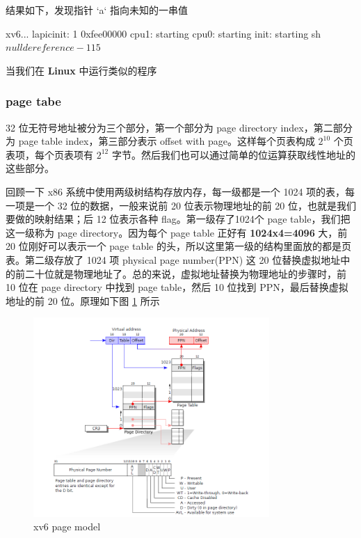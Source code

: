 结果如下，发现指针 `a` 指向未知的一串值

\begin{textcode}
xv6...
lapicinit: 1 0xfee00000
cpu1: starting
cpu0: starting
init: starting sh
$ nulldereference
-115
$ 
\end{textcode}

当我们在 \textbf{Linux} 中运行类似的程序


\subsubsection{page tabe}

32 位无符号地址被分为三个部分，第一个部分为 page directory index，第二部分为 page table index，第三部分表示 offset with page。这样每个页表构成 $2^{10}$ 个页表项，每个页表项有 $2^{12}$ 字节。然后我们也可以通过简单的位运算获取线性地址的这些部分。

回顾一下 x86 系统中使用两级树结构存放内存，每一级都是一个 1024 项的表，每一项是一个 32 位的数据，一般来说前 20 位表示物理地址的前 20 位，也就是我们要做的映射结果；后 12 位表示各种 flag。第一级存了1024个 page table，我们把这一级称为 page directory。因为每个 page table 正好有 \textbf{1024x4=4096} 大，前 20 位刚好可以表示一个 page table 的头，所以这里第一级的结构里面放的都是页表。第二级存放了 1024 项 physical page number(PPN) 这 20 位替换虚拟地址中的前二十位就是物理地址了。总的来说，虚拟地址替换为物理地址的步骤时，前 10 位在 page directory 中找到 page table，然后 10 位找到 PPN，最后替换虚拟地址的前 20 位。原理如下图 \ref{fig:1} 所示

\begin{figure}[h]
    \centering
    \includegraphics[width=0.8\textwidth]{img/pagemodel.PNG}
    \caption{xv6 page model}
    \label{fig:1}
\end{figure}

